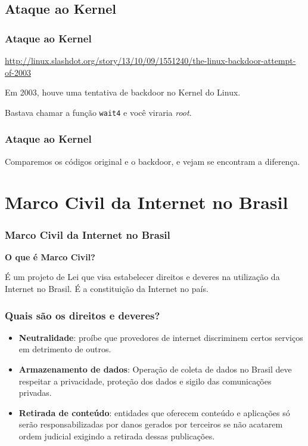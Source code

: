 \begin{frame}\frametitle{}


\end{frame}

\subsection{Ataque ao Kernel}

\begin{frame}[fragile]\frametitle{Ataque ao Kernel}

\url{http://linux.slashdot.org/story/13/10/09/1551240/the-linux-backdoor-attempt-of-2003}

Em 2003, houve uma tentativa de backdoor no Kernel do Linux.


Bastava chamar a função \texttt{wait4} e você viraria \emph{root}.

\end{frame}

\begin{frame}\frametitle{Ataque ao Kernel}

Comparemos os códigos original e o backdoor, e vejam se encontram a
diferença.



\end{frame}

\section{Marco Civil da Internet no Brasil}

\begin{frame}\frametitle{Marco Civil da Internet no Brasil}

\textbf{O que é Marco Civil?}

É um projeto de Lei que visa estabelecer direitos e deveres na
utilização da Internet no Brasil. É a constituição da Internet no país.

\end{frame}

\begin{frame}\frametitle{Quais são os direitos e deveres?}

\begin{itemize}
\item
  \textbf{Neutralidade}: proíbe que provedores de internet discriminem
  certos serviços em detrimento de outros.
\item
  \textbf{Armazenamento de dados}: Operação de coleta de dados no Brasil
  deve respeitar a privacidade, proteção dos dados e sigilo das
  comunicações privadas.
\item
  \textbf{Retirada de conteúdo}: entidades que oferecem conteúdo e
  aplicações só serão responsabilizadas por danos gerados por terceiros
  se não acatarem ordem judicial exigindo a retirada dessas publicações.
\end{itemize}
\end{frame}

